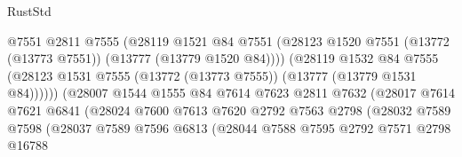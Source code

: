 \begin{lexlean}{RustStd}
\begin{coremodule}
                                      @7551
                                      @2811
                                      @7555
                                      (@28119
                                        @1521
                                        @84
                                        @7551
                                        (@28123
                                          @1520
                                          @7551
                                          (@13772 (@13773 @7551))
                                          (@13777 (@13779 @1520 @84))))
                                      (@28119
                                        @1532
                                        @84
                                        @7555
                                        (@28123
                                          @1531
                                          @7555
                                          (@13772 (@13773 @7555))
                                          (@13777 (@13779 @1531 @84))))))
                                  (@28007
                                    @1544
                                    @1555
                                    @84
                                    @7614
                                    @7623
                                    @2811
                                    @7632
                                    (@28017
                                      @7614
                                      @7621
                                      @6841
                                      (@28024
                                        @7600
                                        @7613
                                        @7620
                                        @2792
                                        @7563
                                        @2798
                                        (@28032
                                          @7589
                                          @7598
                                          (@28037
                                            @7589
                                            @7596
                                            @6813
                                            (@28044
                                              @7588
                                              @7595
                                              @2792
                                              @7571
                                              @2798
                                              @16788

\end{coremodule}
\end{lexlean}

